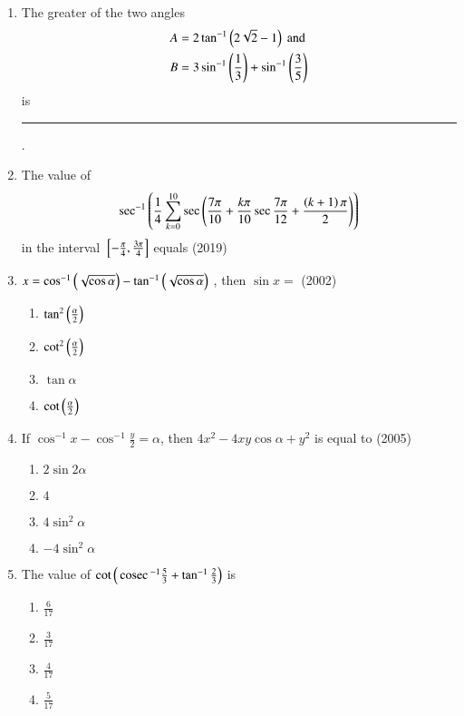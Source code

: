 \begin{enumerate}[label=\thesubsection.\arabic*,ref=\thesubsection.\theenumi]
\hfill {}
\item The greater of the two angles 
\begin{align*}
A &= 2 \tan ^{-1}\left(2\sqrt{2}-1\right) \text{ and}\\
B &= 3\sin ^{-1}\left(\frac{1}{3}\right) + \sin ^{-1}\left(\frac{3}{5}\right)
\end{align*}
is \rule{1cm}{0.1pt}.
\hfill {}
%
%		
\item{
		The value of $$\sec^{-1}\left(\frac{1}{4}\sum_{k=0}^{10} \sec\left(\frac{7\pi}{10}+\frac{k\pi}{10} \sec{\frac{7\pi}{12}+\frac{\ensuremath{\left(k+1\right)}\pi}{2}}\right)\right)$$ in the interval ${}\left[-\frac{\pi}{4},\frac{3\pi}{4}\right]$ equals \hfill (2019)	
	}
	\item{
			$x=\cos^{-1}\left(\sqrt{\cos\alpha}\right)-\tan^{-1}\left(\sqrt{\cos\alpha}\right)$ , then $\sin x =$ \hfill (2002)
		\begin{multicols}{4}
		\begin{enumerate}
			\item{$\tan^2 \left(\frac{\alpha}{2}\right)$}
%			
			\item{$\cot^2 \left(\frac{\alpha}{2}\right)$}
%			
			\item{$\tan\alpha$}
%			
			\item{$\cot \left(\frac{\alpha}{2}\right)$}
		\end{enumerate}
		\end{multicols}
	}
	\item{
			If $\cos^{-1}x - \cos^{-1}\frac{y}{2} = \alpha$, then $4x^2 - 4xy \cos \alpha + y^2$ is equal to \hfill (2005)
		\begin{multicols}{4}
		\begin{enumerate}
			\item{$2 \sin 2\alpha$}
%			
			\item{$4$}
%			
			\item{$4 \sin^2 \alpha$}
%			
			\item{$-4 \sin^2 \alpha$}
		\end{enumerate}
		\end{multicols}
	}
	\item{
			The value of $\cot\left(\,\text{cosec}\,^{-1}\frac{5}{3} + \tan^{-1}\frac{2}{3}\right)$ is
		\begin{multicols}{4}
		\begin{enumerate}
			\item{$\frac{6}{17}$}
			\item{$\frac{3}{17}$}
			\item{$ \frac{4}{17}$}
			\item{$ \frac{5}{17}$}
		\end{enumerate}

\end{multicols}}
\end{enumerate}
